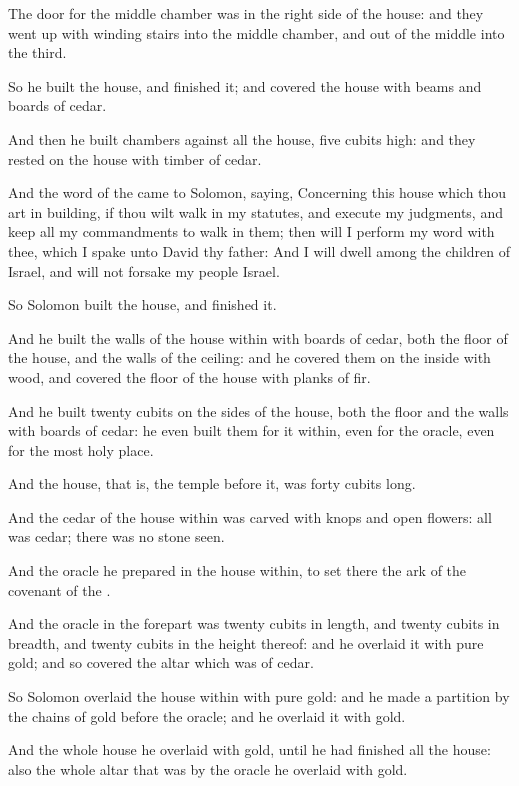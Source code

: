 \verse The door for the middle chamber was in the right side of the house: and they went up with winding stairs into the middle chamber, and out of the middle into the third.

\verse So he built the house, and finished it; and covered the house with beams and boards of cedar.

\verse And then he built chambers against all the house, five cubits high: and they rested on the house with timber of cedar.

\verse And the word of the \LORD came to Solomon, saying, \verse Concerning this house which thou art in building, if thou wilt walk in my statutes, and execute my judgments, and keep all my commandments to walk in them; then will I perform my word with thee, which I spake unto David thy father: \verse And I will dwell among the children of Israel, and will not forsake my people Israel.

\verse So Solomon built the house, and finished it.

\verse And he built the walls of the house within with boards of cedar, both the floor of the house, and the walls of the ceiling: and he covered them on the inside with wood, and covered the floor of the house with planks of fir.

\verse And he built twenty cubits on the sides of the house, both the floor and the walls with boards of cedar: he even built them for it within, even for the oracle, even for the most holy place.

\verse And the house, that is, the temple before it, was forty cubits long.

\verse And the cedar of the house within was carved with knops and open flowers: all was cedar; there was no stone seen.

\verse And the oracle he prepared in the house within, to set there the ark of the covenant of the \LORD.

\verse And the oracle in the forepart was twenty cubits in length, and twenty cubits in breadth, and twenty cubits in the height thereof: and he overlaid it with pure gold; and so covered the altar which was of cedar.

\verse So Solomon overlaid the house within with pure gold: and he made a partition by the chains of gold before the oracle; and he overlaid it with gold.

\verse And the whole house he overlaid with gold, until he had finished all the house: also the whole altar that was by the oracle he overlaid with gold.

